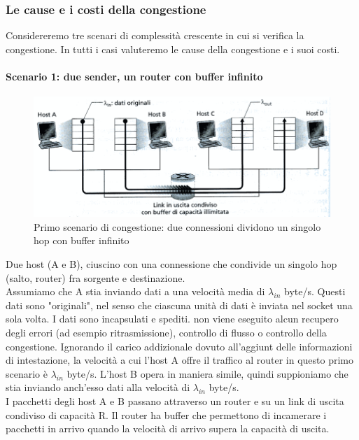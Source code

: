 \documentclass[11pt,a4paper]{article}
\begin{document}
\subsubsection{Le cause e i costi della congestione}
Considereremo tre scenari di complessità crescente in cui si verifica la congestione. In tutti i casi valuteremo le cause della congestione e i suoi costi.
\paragraph{Scenario 1: due sender, un router con buffer infinito}
\begin{figure}
	\includegraphics[scale=0.6]{img/039.png}
	\caption{Primo scenario di congestione: due connessioni dividono un singolo hop con buffer infinito}
\end{figure}
Due host (A e B), ciuscino con una connessione che condivide un singolo hop (salto, router) fra sorgente e destinazione.\\
Assumiamo che A stia inviando dati a una velocità media di $\lambda_{in}$ byte/s. Questi dati sono "originali", nel senso che ciascuna unità di dati è inviata nel socket una sola volta. I dati sono incapsulati e spediti. non viene eseguito alcun recupero degli errori (ad esempio ritrasmissione), controllo di flusso o controllo della congestione. Ignorando il carico addizionale dovuto all'aggiunt delle informazioni di intestazione, la velocità a cui l'host A offre il traffico al router in questo primo scenario è $\lambda_{in}$ byte/s. L'host B opera in maniera simile, quindi suppioniamo che stia inviando anch'esso dati alla velocità di $\lambda_{in}$ byte/s.\\
I pacchetti degli host A e B passano attraverso un router e su un link di uscita condiviso di capacità R. Il router ha buffer che permettono di incamerare i pacchetti in arrivo quando la velocità di arrivo supera la capacità di uscita. \\
\end{document}

